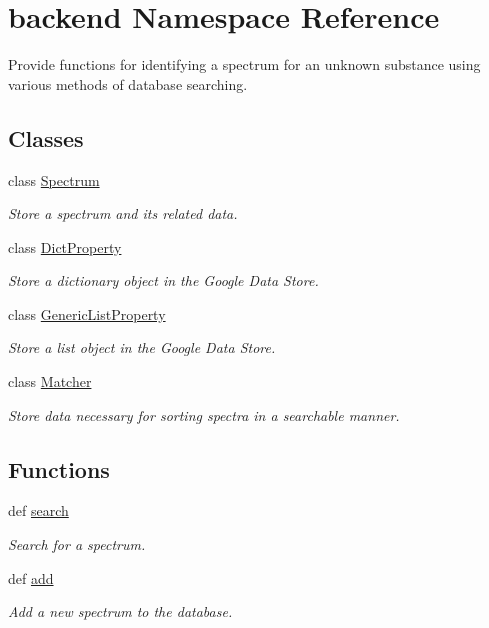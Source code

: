 \hypertarget{namespacebackend}{
\section{backend Namespace Reference}
\label{namespacebackend}
}


Provide functions for identifying a spectrum for an unknown substance using various methods of database searching.  
\subsection*{Classes}
\begin{DoxyCompactItemize}
\item 
class \hyperlink{classbackend_1_1_spectrum}{Spectrum}
\begin{DoxyCompactList}\small\item\em Store a spectrum and its related data. \item\end{DoxyCompactList}\item 
class \hyperlink{classbackend_1_1_dict_property}{DictProperty}
\begin{DoxyCompactList}\small\item\em Store a dictionary object in the Google Data Store. \item\end{DoxyCompactList}\item 
class \hyperlink{classbackend_1_1_generic_list_property}{GenericListProperty}
\begin{DoxyCompactList}\small\item\em Store a list object in the Google Data Store. \item\end{DoxyCompactList}\item 
class \hyperlink{classbackend_1_1_matcher}{Matcher}
\begin{DoxyCompactList}\small\item\em Store data necessary for sorting spectra in a searchable manner. \item\end{DoxyCompactList}\end{DoxyCompactItemize}
\subsection*{Functions}
\begin{DoxyCompactItemize}
\item 
def \hyperlink{namespacebackend_af7a9bbf936ca6c76342679bb4a3509cd}{search}
\begin{DoxyCompactList}\small\item\em Search for a spectrum. \item\end{DoxyCompactList}\item 
def \hyperlink{namespacebackend_a31148baaaad7ef57779210d868d99ad7}{add}
\begin{DoxyCompactList}\small\item\em Add a new spectrum to the database. \item\end{DoxyCompactList}\end{DoxyCompactItemize}


